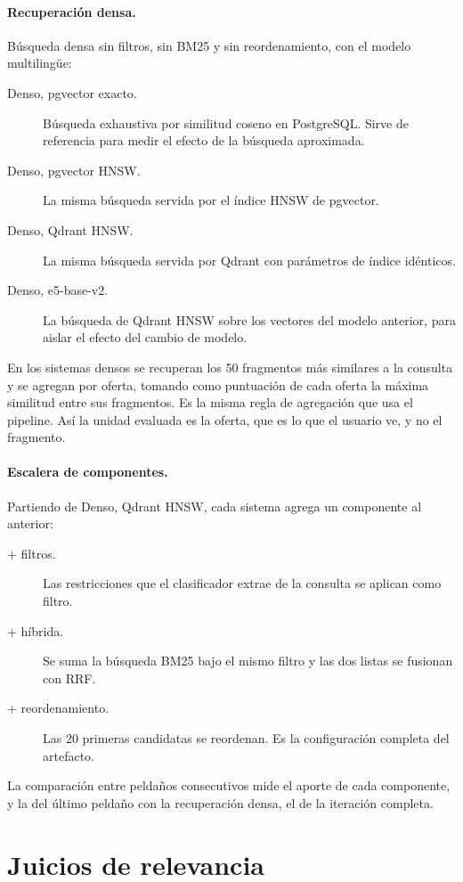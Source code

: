 \paragraph{Recuperación densa.} Búsqueda densa sin filtros, sin BM25 y sin reordenamiento, con el modelo multilingüe:
\begin{description}
    \item[Denso, pgvector exacto.] Búsqueda exhaustiva por similitud coseno en PostgreSQL. Sirve de referencia para medir el efecto de la búsqueda aproximada.
    \item[Denso, pgvector HNSW.] La misma búsqueda servida por el índice HNSW de pgvector.
    \item[Denso, Qdrant HNSW.] La misma búsqueda servida por Qdrant con parámetros de índice idénticos.
    \item[Denso, e5-base-v2.] La búsqueda de Qdrant HNSW sobre los vectores del modelo anterior, para aislar el efecto del cambio de modelo.
\end{description}
En los sistemas densos se recuperan los 50 fragmentos más similares a la consulta y se agregan por oferta, tomando como puntuación de cada oferta la máxima similitud entre sus fragmentos. Es la misma regla de agregación que usa el pipeline. Así la unidad evaluada es la oferta, que es lo que el usuario ve, y no el fragmento.

\paragraph{Escalera de componentes.} Partiendo de Denso, Qdrant HNSW, cada sistema agrega un componente al anterior:
\begin{description}
    \item[+ filtros.] Las restricciones que el clasificador extrae de la consulta se aplican como filtro.
    \item[+ híbrida.] Se suma la búsqueda BM25 bajo el mismo filtro y las dos listas se fusionan con RRF.
    \item[+ reordenamiento.] Las 20 primeras candidatas se reordenan. Es la configuración completa del artefacto.
\end{description}
La comparación entre peldaños consecutivos mide el aporte de cada componente, y la del último peldaño con la recuperación densa, el de la iteración completa.

\section{Juicios de relevancia}
\label{sec:met-juicios}

